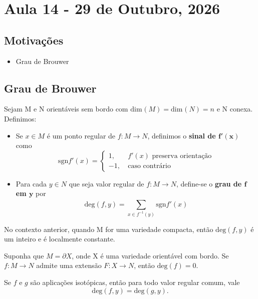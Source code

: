 \documentclass[../differential_topology.tex]{subfiles}
\begin{document}
\section{Aula 14 - 29 de Outubro, 2026}
\subsection{Motivações}
\begin{itemize}
	\item Grau de Brouwer
\end{itemize}
\subsection{Grau de Brouwer}
\begin{def*}
	Sejam M e N orientáveis sem bordo com \(\mathrm{dim}_{}(M) = \mathrm{dim}_{}(N) = n\) e N conexa. Definimos:
	\begin{itemize}
		\item[i)] Se \(x\in M\) é um ponto regular de \(f:M\rightarrow N\), definimos o \textbf{sinal de \(\mathbf{f'(x)}\)} como
		      \[
			      \mathrm{sgn} f'(x) = \left\{\begin{array}{ll}
				      1, \quad & f'(x) \text{ preserva orientação} \\
				      -1,      & \text{caso contrário}
			      \end{array}\right.
		      \]
		\item[ii)] Para cada \(y\in N\) que seja valor regular de \(f:M\rightarrow N\), define-se o \textbf{grau de \(\mathbf{f}\) em \(\mathbf{y}\)} por
		      \[
			      \mathrm{deg}(f, y)=\sum\limits_{x\in f^{-1}(y)}^{}\mathrm{sgn}f'(x)
		      \]
	\end{itemize}
\end{def*}

\begin{prop*}
	No contexto anterior, quando M for uma variedade compacta, então \linebreak \(\mathrm{deg}(f, y)\) é um inteiro e é localmente constante.
\end{prop*}

\begin{lemma*}
	Suponha que \(M = \partial X\), onde X é uma variedade orientável com bordo. Se \(f:M\rightarrow N\) admite uma extensão \(F:X\rightarrow N\), então \(\mathrm{deg}(f) = 0\).
\end{lemma*}
\begin{lemma*}
	Se \(f\) e \(g\) são aplicações isotópicas, então para todo valor regular comum, vale
	\[
		\mathrm{deg}(f, y) = \mathrm{deg}(g, y).
	\]
\end{lemma*}
\end{document}
